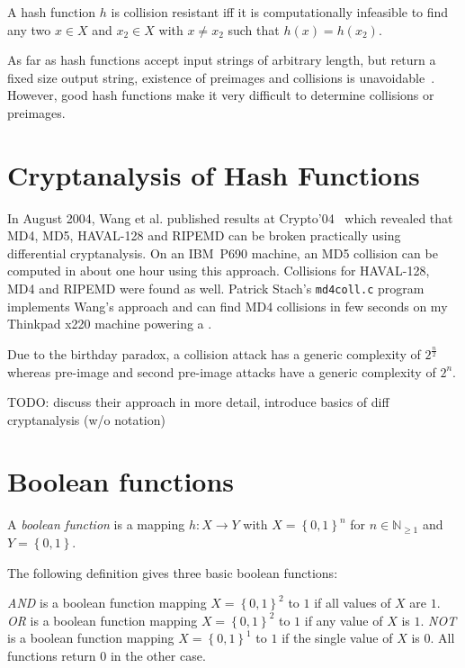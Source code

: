 \begin{defi}
  A hash function $h$ is collision resistant iff it is computationally infeasible to
  find any two $x \in X$ and $x_2 \in X$ with $x \neq x_2$ such that $h(x) = h(x_2)$.
\end{defi}

As far as hash functions accept input strings of arbitrary length, but return a fixed
size output string, existence of preimages and collisions is unavoidable~\cite{schlaffer}.
However, good hash functions make it very difficult to determine collisions or preimages.

\section{Cryptanalysis of Hash Functions}
\label{ch:cryptanalysis}
%
In August 2004, Wang et al. published results at Crypto'04~\cite{wang2004} which revealed
that MD4, MD5, HAVAL-128 and RIPEMD can be broken practically using differential cryptanalysis.
On an IBM~P690 machine, an MD5 collision can be computed in about one hour using this approach.
Collisions for HAVAL-128, MD4 and RIPEMD were found as well. Patrick Stach's \texttt{md4coll.c}
program~\cite{md4coll} implements Wang's approach and can find MD4 collisions in few seconds
on my Thinkpad x220 machine powering a .

Due to the birthday paradox, a collision attack has a generic complexity of $2^{\frac n2}$ whereas pre-image and second pre-image attacks have a generic complexity of $2^n$.

TODO: discuss their approach in more detail, introduce basics of diff cryptanalysis (w/o notation)

\section{Boolean functions}
\label{ch:bool-functions}
%
\begin{defi}
  A \emph{boolean function} is a mapping $h: X \to Y$ with $X = \left\{0,1\right\}^n$
  for $n \in \mathbb N_{\geq 1}$ and $Y = \left\{0,1\right\}$.
\end{defi}

The following definition gives three basic boolean functions:

\begin{defi}
  \emph{AND} is a boolean function mapping $X = \left\{0,1\right\}^2$
  to $1$ if all values of $X$ are $1$.
  \emph{OR} is a boolean function mapping $X = \left\{0,1\right\}^2$
  to $1$ if any value of $X$ is $1$.
  \emph{NOT} is a boolean function mapping $X = \left\{0,1\right\}^1$
  to $1$ if the single value of $X$ is $0$.
  All functions return $0$ in the other case.
\end{defi}

